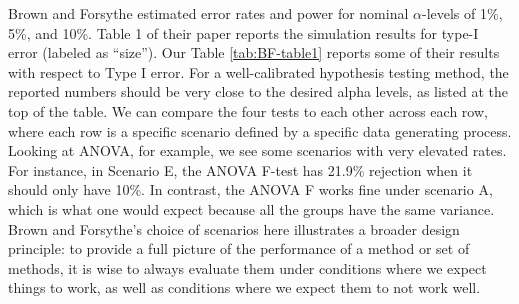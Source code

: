 \documentclass[
]{book}
\begin{document}
Brown and Forsythe estimated error rates and power for nominal \(\alpha\)-levels of 1\%, 5\%, and 10\%.
Table 1 of their paper reports the simulation results for type-I error (labeled as ``size'').
Our Table \ref{tab:BF-table1} reports some of their results with respect to Type I error.
For a well-calibrated hypothesis testing method, the reported numbers should be very close to the desired alpha levels, as listed at the top of the table.
We can compare the four tests to each other across each row, where each row is a specific scenario defined by a specific data generating process.
Looking at ANOVA, for example, we see some scenarios with very elevated rates. For instance, in Scenario E, the ANOVA F-test has 21.9\% rejection when it should only have 10\%.
In contrast, the ANOVA F works fine under scenario A, which is what one would expect because all the groups have the same variance.
Brown and Forsythe's choice of scenarios here illustrates a broader design principle: to provide a full picture of the performance of a method or set of methods, it is wise to always evaluate them under conditions where we expect things to work, as well as conditions where we expect them to not work well.
\end{document}
